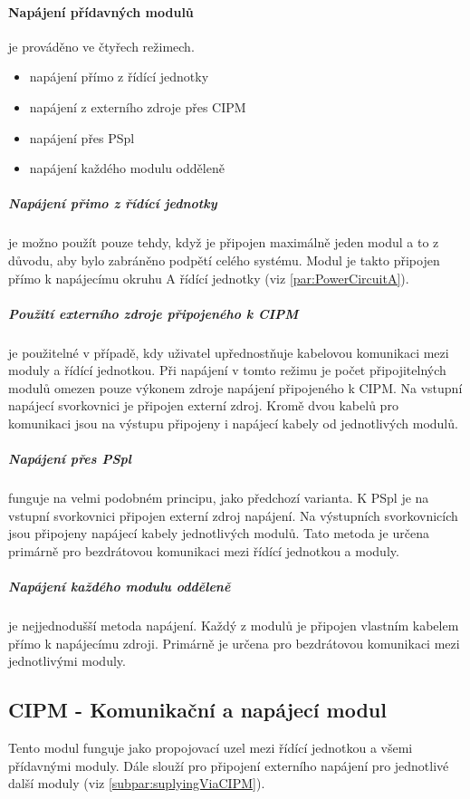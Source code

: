 \paragraph{Napájení přídavných modulů}
je prováděno ve čtyřech režimech.
\begin{itemize}
    \item napájení přímo z řídící jednotky
    \item napájení z externího zdroje přes CIPM
    \item napájení přes PSpl
    \item napájení každého modulu odděleně
\end{itemize}

\subparagraph{Napájení přimo z řídící jednotky}
je možno použít pouze tehdy, když je připojen maximálně jeden modul a to z důvodu, aby bylo zabráněno podpětí celého systému.
Modul je takto připojen přímo k napájecímu okruhu A řídící jednotky (viz \autoref{par:PowerCircuitA}).

\subparagraph{Použití externího zdroje připojeného k CIPM}
\label{subpar:suplyingViaCIPM}
je použitelné v případě, kdy uživatel upřednostňuje kabelovou komunikaci mezi moduly a řídící jednotkou.
Při napájení v tomto režimu je počet připojitelných modulů omezen pouze výkonem zdroje napájení připojeného k CIPM.
Na vstupní napájecí svorkovnici je připojen externí zdroj. 
Kromě dvou kabelů pro komunikaci jsou na výstupu připojeny i napájecí kabely od jednotlivých modulů.

\subparagraph{Napájení přes PSpl}
funguje na velmi podobném principu, jako předchozí varianta. 
K PSpl je na vstupní svorkovnici připojen externí zdroj napájení.
Na výstupních svorkovnicích jsou připojeny napájecí kabely jednotlivých modulů.
Tato metoda je určena primárně pro bezdrátovou komunikaci mezi řídící jednotkou a moduly.

\subparagraph{Napájení každého modulu odděleně}
je nejjednodušší metoda napájení.
Každý z modulů je připojen vlastním kabelem přímo k napájecímu zdroji.
Primárně je určena pro bezdrátovou komunikaci mezi jednotlivými moduly. 

\subsection{CIPM - Komunikační a napájecí modul}
\label{subsec:CIPM}
Tento modul funguje jako propojovací uzel mezi řídící jednotkou a všemi přídavnými moduly.
Dále slouží pro připojení externího napájení pro jednotlivé další moduly (viz \autoref{subpar:suplyingViaCIPM}).

